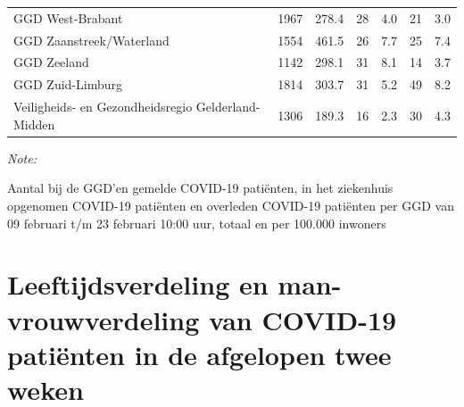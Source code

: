 \documentclass[
  english,
  man,floatsintext]{apa6}
\begin{document}
\begin{table}[H]
\begin{threeparttable}
\begin{tabular}{lrrrrrr}
GGD West-Brabant & 1967 & 278.4 & 28 & 4.0 & 21 & 3.0\\
GGD Zaanstreek/Waterland & 1554 & 461.5 & 26 & 7.7 & 25 & 7.4\\
GGD Zeeland & 1142 & 298.1 & 31 & 8.1 & 14 & 3.7\\
GGD Zuid-Limburg & 1814 & 303.7 & 31 & 5.2 & 49 & 8.2\\
Veiligheids- en Gezondheidsregio Gelderland-Midden & 1306 & 189.3 & 16 & 2.3 & 30 & 4.3\\
\bottomrule
\end{tabular}
\begin{tablenotes}
\item \textit{Note: } 
\item Aantal bij de GGD’en gemelde COVID-19 patiënten, in het ziekenhuis opgenomen COVID-19 patiënten en overleden COVID-19 patiënten per GGD van 09 februari t/m 23 februari 10:00 uur, totaal en per 100.000 inwoners
\end{tablenotes}
\end{threeparttable}
\endgroup{}
\end{table}

\newpage

\hypertarget{leeftijdsverdeling-en-man-vrouwverdeling-van-covid-19-patiuxebnten-in-de-afgelopen-twee-weken}{%
\section{Leeftijdsverdeling en man-vrouwverdeling van COVID-19 patiënten in de afgelopen twee weken}\label{leeftijdsverdeling-en-man-vrouwverdeling-van-covid-19-patiuxebnten-in-de-afgelopen-twee-weken}}
\end{document}
